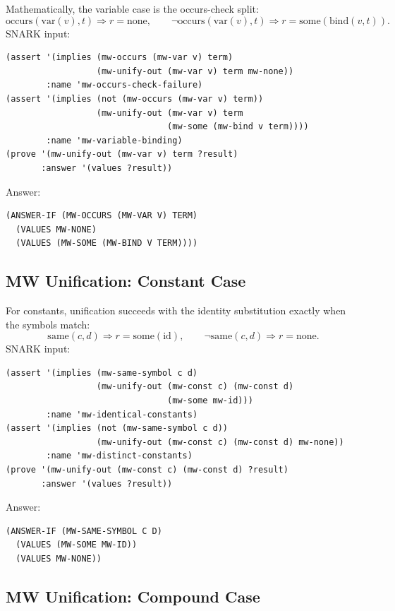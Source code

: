 \documentclass[runningheads]{llncs}
\begin{document}
Mathematically, the variable case is the occurs-check split:
\[
  \mathrm{occurs}(\mathrm{var}(v),t) \Rightarrow r=\mathrm{none},
  \qquad
  \neg\mathrm{occurs}(\mathrm{var}(v),t)
    \Rightarrow r=\mathrm{some}(\mathrm{bind}(v,t)).
\]
SNARK input:
\begin{lstlisting}
(assert '(implies (mw-occurs (mw-var v) term)
                  (mw-unify-out (mw-var v) term mw-none))
        :name 'mw-occurs-check-failure)
(assert '(implies (not (mw-occurs (mw-var v) term))
                  (mw-unify-out (mw-var v) term
                                (mw-some (mw-bind v term))))
        :name 'mw-variable-binding)
(prove '(mw-unify-out (mw-var v) term ?result)
       :answer '(values ?result))
\end{lstlisting}
Answer:
\begin{lstlisting}
(ANSWER-IF (MW-OCCURS (MW-VAR V) TERM)
  (VALUES MW-NONE)
  (VALUES (MW-SOME (MW-BIND V TERM))))
\end{lstlisting}

\subsection{MW Unification: Constant Case}

For constants, unification succeeds with the identity substitution exactly when
the symbols match:
\[
  \mathrm{same}(c,d) \Rightarrow r=\mathrm{some}(\mathrm{id}),
  \qquad
  \neg\mathrm{same}(c,d) \Rightarrow r=\mathrm{none}.
\]
SNARK input:
\begin{lstlisting}
(assert '(implies (mw-same-symbol c d)
                  (mw-unify-out (mw-const c) (mw-const d)
                                (mw-some mw-id)))
        :name 'mw-identical-constants)
(assert '(implies (not (mw-same-symbol c d))
                  (mw-unify-out (mw-const c) (mw-const d) mw-none))
        :name 'mw-distinct-constants)
(prove '(mw-unify-out (mw-const c) (mw-const d) ?result)
       :answer '(values ?result))
\end{lstlisting}
Answer:
\begin{lstlisting}
(ANSWER-IF (MW-SAME-SYMBOL C D)
  (VALUES (MW-SOME MW-ID))
  (VALUES MW-NONE))
\end{lstlisting}

\subsection{MW Unification: Compound Case}
\end{document}
